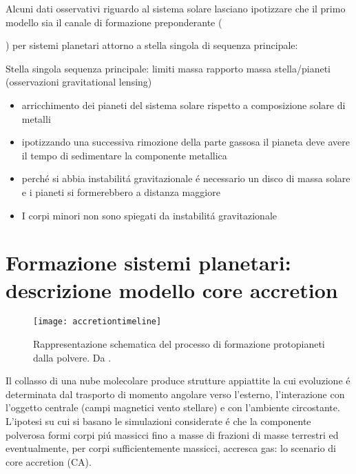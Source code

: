 \documentclass[twoside,11pt,fleqn]{memoir}%
\begin{document}
Alcuni dati osservativi riguardo al sistema solare lasciano ipotizzare che il primo modello sia il canale di formazione preponderante (\begin{workout}\end{workout}) per sistemi planetari attorno a stella singola di sequenza principale:
\begin{workout}{Stella singola sequenza principale: limiti massa}
rapporto massa stella/pianeti (osservazioni gravitational lensing)
\end{workout}
\begin{itemize}
\item arricchimento dei pianeti del sistema solare rispetto a composizione solare di metalli%
\item ipotizzando una successiva rimozione della parte gassosa il pianeta deve avere il tempo di sedimentare la componente metallica
\item perch\'e si abbia instabilit\'a gravitazionale \'e necessario un disco di massa solare e i pianeti si formerebbero a distanza maggiore
\item I corpi minori non sono spiegati da instabilit\'a gravitazionale
\end{itemize}


\cleartorecto

{\let\clearpage\relax\let\cleardoublepage\relax
\part{Formazione sistemi planetari: descrizione modello core accretion}\label{part:CAdesc}
}
\begin{figure}[!ht]
\texttt{[image: accretiontimeline]}\caption{Rappresentazione schematica del processo di formazione protopianeti dalla polvere. Da \cite{perryman2011exoplanet}.}\label{fig:accretiontimeline}
\end{figure}
Il collasso di una nube molecolare produce strutture appiattite la cui evoluzione \'e determinata dal trasporto di momento angolare verso l'esterno, l'interazione con l'oggetto centrale (campi magnetici vento stellare) e con l'ambiente circostante.
L'ipotesi su cui si basano le simulazioni considerate \'e che la componente polverosa formi corpi pi\'u massicci fino a masse di frazioni di masse terrestri  ed eventualmente, per corpi sufficientemente massicci, accresca gas: lo scenario di core accretion (CA).

\cleartorecto
\end{document}
